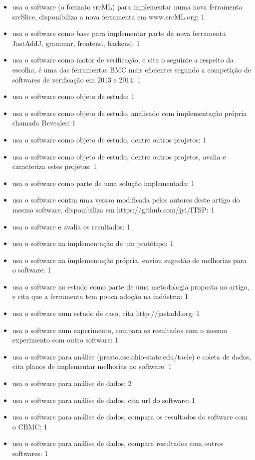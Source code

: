 \begin{itemize}
\item usa o software (o formato srcML) para implementar numa nova ferramenta srcSlice, disponibiliza a nova ferramenta em www.srcML.org: 1
\item usa o software como base para implementar parte da nova ferramenta JastAddJ, grammar, frontend, backend: 1
\item usa o software como motor de verificação, e cita o seguinte a respeito da escolha, é uma das ferramentas BMC mais eficientes segundo a competição de softwares de verificação em 2013 e 2014: 1
\item usa o software como objeto de estudo: 1
\item usa o software como objeto de estudo, analisado com implementação própria chamada Revealer: 1
\item usa o software como objeto de estudo, dentre outros projetos: 1
\item usa o software como objeto de estudo, dentre outros projetos, avalia e caracteriza estes projetos: 1
\item usa o software como parte de uma solução implementada: 1
\item usa o software contra uma versao modificada pelos autores deste artigo do mesmo software, disponibiliza em https://github.com/jyi/ITSP: 1
\item usa o software e avalia os resultados: 1
\item usa o software na implementação de um protótipo: 1
\item usa o software na implementação própria, enviou sugestão de melhorias para o software: 1
\item usa o software no estudo como parte de uma metodologia proposta no artigo, e cita que a ferramenta tem pouca adoção na indústria: 1
\item usa o software num estudo de caso, cita http://jastadd.org: 1
\item usa o software num experimento, compara os resultados com o mesmo experimento com outro software: 1
\item usa o software para análise (presto.cse.ohio-state.edu/tacle) e coleta de dados, cita planos de implementar melhorias no software: 1
\item usa o software para análise de dados: 2
\item usa o software para análise de dados, cita url do software: 1
\item usa o software para análise de dados, compara os resultados do software com o CBMC: 1
\item usa o software para análise de dados, compara resultados com outros softwares: 1

\end{itemize}
